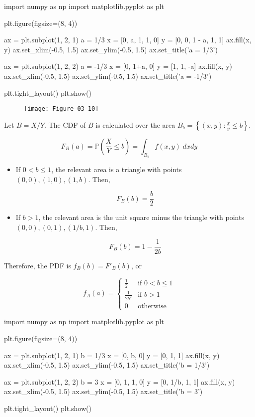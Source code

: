 \begin{python}
import numpy as np
import matplotlib.pyplot as plt

plt.figure(figsize=(8, 4))

ax = plt.subplot(1, 2, 1)
a = 1/3
x = [0, a, 1, 1, 0]
y = [0, 0, 1 - a, 1, 1]
ax.fill(x, y)
ax.set_xlim(-0.5, 1.5)
ax.set_ylim(-0.5, 1.5)
ax.set_title('a = 1/3')

ax = plt.subplot(1, 2, 2)
a = -1/3
x = [0, 1+a, 0]
y = [1, 1, -a]
ax.fill(x, y)
ax.set_xlim(-0.5, 1.5)
ax.set_ylim(-0.5, 1.5)
ax.set_title('a = -1/3')

plt.tight_layout()
plt.show()
\end{python}

\begin{figure}[H]
\texttt{[image: Figure-03-10]}
\end{figure}

Let \(B = X/Y\). The CDF of \(B\) is calculated over the area
\(B_b = \left\{ (x, y) : \frac{x}{y} \leq b \right\}\).

\[ F_B(a) = \mathbb{P}\left(\frac{X}{Y} \leq b\right) = \int_{B_b} f(x, y)\; dx dy \]

\begin{itemize}
\item
  If \(0 < b \leq 1\), the relevant area is a triangle with points
  \((0, 0), (1, 0), (1, b)\). Then,

  \[ F_B(b) = \frac{b}{2} \]
\item
  If \(b > 1\), the relevant area is the unit square minus the triangle
  with points \((0, 0), (0, 1), (1/b, 1)\). Then,

  \[ F_B(b) = 1 - \frac{1}{2b} \]
\end{itemize}

Therefore, the PDF is \(f_B(b) = F'_B(b)\), or

\[ 
f_A(a) = \begin{cases}
\frac{1}{2} &\text{if } 0 < b \leq 1 \\
\frac{1}{2b^2} &\text{if } b > 1 \\
0 &\text{otherwise}
\end{cases} 
\]

\begin{python}
import numpy as np
import matplotlib.pyplot as plt

plt.figure(figsize=(8, 4))

ax = plt.subplot(1, 2, 1)
b = 1/3
x = [0, b, 0]
y = [0, 1, 1]
ax.fill(x, y)
ax.set_xlim(-0.5, 1.5)
ax.set_ylim(-0.5, 1.5)
ax.set_title('b = 1/3')

ax = plt.subplot(1, 2, 2)
b = 3
x = [0, 1, 1, 0]
y = [0, 1/b, 1, 1]
ax.fill(x, y)
ax.set_xlim(-0.5, 1.5)
ax.set_ylim(-0.5, 1.5)
ax.set_title('b = 3')

plt.tight_layout()
plt.show()
\end{python}

